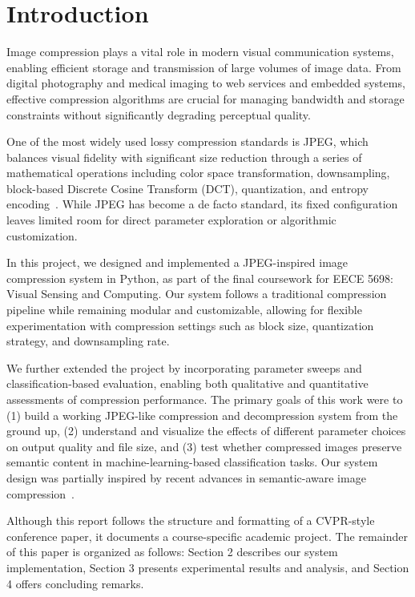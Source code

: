 \section{Introduction}
\label{sec:intro}

Image compression plays a vital role in modern visual communication systems, enabling efficient storage and transmission of large volumes of image data. From digital photography and medical imaging to web services and embedded systems, effective compression algorithms are crucial for managing bandwidth and storage constraints without significantly degrading perceptual quality.

One of the most widely used lossy compression standards is JPEG, which balances visual fidelity with significant size reduction through a series of mathematical operations including color space transformation, downsampling, block-based Discrete Cosine Transform (DCT), quantization, and entropy encoding~\cite{haines1992compression,jpegOverview2025}. While JPEG has become a de facto standard, its fixed configuration leaves limited room for direct parameter exploration or algorithmic customization.

In this project, we designed and implemented a JPEG-inspired image compression system in Python, as part of the final coursework for EECE 5698: Visual Sensing and Computing. Our system follows a traditional compression pipeline while remaining modular and customizable, allowing for flexible experimentation with compression settings such as block size, quantization strategy, and downsampling rate. 

We further extended the project by incorporating parameter sweeps and classification-based evaluation, enabling both qualitative and quantitative assessments of compression performance. The primary goals of this work were to (1) build a working JPEG-like compression and decompression system from the ground up, (2) understand and visualize the effects of different parameter choices on output quality and file size, and (3) test whether compressed images preserve semantic content in machine-learning-based classification tasks. Our system design was partially inspired by recent advances in semantic-aware image compression~\cite{semanticDiffusion2023}.

Although this report follows the structure and formatting of a CVPR-style conference paper, it documents a course-specific academic project. The remainder of this paper is organized as follows: Section 2 describes our system implementation, Section 3 presents experimental results and analysis, and Section 4 offers concluding remarks.
